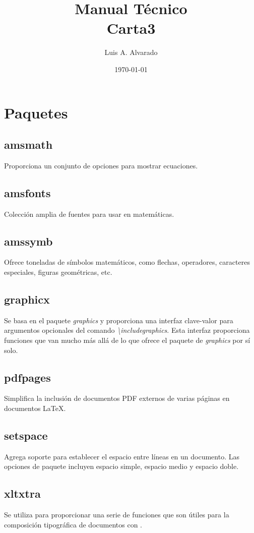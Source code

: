 \documentclass[12pt]{article}
\title{Manual Técnico \\ Carta3}
\author{Luis A. Alvarado}
\date{\today}
\begin{document}
\maketitle{}

\tableofcontents

\clearpage
\newpage

\section{Paquetes}
\subsection{amsmath}
Proporciona un conjunto de opciones para mostrar ecuaciones. \cite{amsmath}
\subsection{amsfonts}
Colección amplia de fuentes para usar en matemáticas. \cite{amsfonts}
\subsection{amssymb}
Ofrece toneladas de símbolos matemáticos, como flechas, operadores, caracteres especiales, figuras geométricas, etc. \cite{amssymb}
\subsection{graphicx}
Se basa en el paquete \textit{graphics} y proporciona una interfaz clave-valor para argumentos opcionales del comando \textit{\textbackslash includegraphics}. Esta interfaz proporciona funciones que van mucho más allá de lo que ofrece el paquete de \textit{graphics} por sí solo. \cite{graphicx}
\subsection{pdfpages}
Simplifica la inclusión de documentos PDF externos de varias páginas en documentos \LaTeX.\cite{pdfpages}
\subsection{setspace}
Agrega soporte para establecer el espacio entre líneas en un documento. Las opciones de paquete incluyen espacio simple, espacio medio y espacio doble. \cite{setspace}
\subsection{xltxtra}
Se utiliza para proporcionar una serie de funciones que son útiles para la composición tipográfica de documentos con . \cite{xltxtra}
\end{document}
